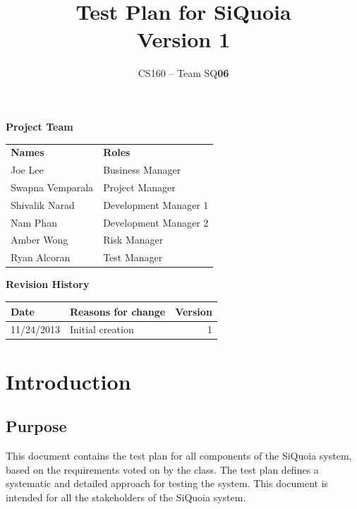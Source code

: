 \documentclass[12pt]{article}
\begin{document}
\title{Test Plan for SiQuoia \\ {\small Version 1}}

\author{{\large CS160 -- Team SQ{\bf 06}}}

\begin{titlepage}
\maketitle

{\bf Project Team}
\begin{center}
\begin{tabular}{p{4cm} l}
{\bf Names}         & {\bf Roles} \\[.5em]
Joe Lee             & Business Manager \\[1em]
Swapna Vemparala    & Project Manager \\[1em]
Shivalik Narad      & Development Manager 1 \\[1em]
Nam Phan            & Development Manager 2 \\[1em]
Amber Wong          & Risk Manager \\[1em]
Ryan Alcoran        & Test Manager
\end{tabular}
\end{center}

{\bf Revision History}
\begin{center}
\begin{tabular}{|l|l|r|}
\hline
{\bf Date}      & {\bf Reasons for change}  & {\bf Version} \\
\hline
11/24/2013      & Initial creation          & 1 \\
\hline
\end{tabular}
\end{center}

\end{titlepage}

\tableofcontents

\newpage
\section{Introduction}

\subsection{Purpose}
This document contains the test plan for all components of the SiQuoia
system, based on the requirements voted on by the class. The test plan
defines a systematic and detailed approach for testing the
system. This document is intended for all the stakeholders of the
SiQuoia system.
\end{document}
